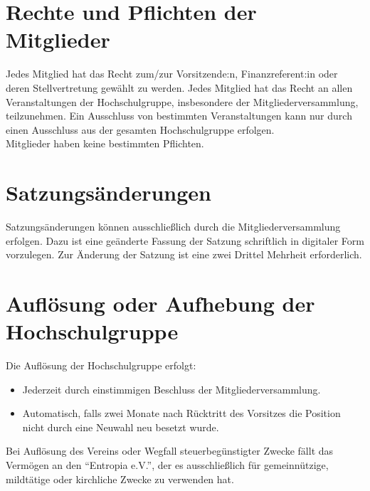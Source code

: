\documentclass[11pt]{article}
\begin{document}
\section{Rechte und Pflichten der Mitglieder}
Jedes Mitglied hat das Recht zum/zur Vorsitzende:n, Finanzreferent:in oder deren Stellvertretung gewählt zu werden. Jedes Mitglied hat das Recht an allen Veranstaltungen der Hochschulgruppe, insbesondere der Mitgliederversammlung, teilzunehmen. Ein Ausschluss von bestimmten Veranstaltungen kann nur durch einen Ausschluss aus der gesamten Hochschulgruppe erfolgen.\\
Mitglieder haben keine bestimmten Pflichten.
\section{Satzungsänderungen}
Satzungsänderungen können ausschließlich durch die Mitgliederversammlung erfolgen. Dazu ist eine geänderte Fassung der Satzung schriftlich in digitaler Form vorzulegen. Zur Änderung der Satzung ist eine zwei Drittel Mehrheit erforderlich.
\section{Auflösung oder Aufhebung der Hochschulgruppe}
Die Auflösung der Hochschulgruppe erfolgt:
\begin{itemize}
	\item Jederzeit durch einstimmigen Beschluss der Mitgliederversammlung.
	\item Automatisch, falls zwei Monate nach Rücktritt des Vorsitzes die Position nicht durch eine Neuwahl neu besetzt wurde.
\end{itemize}
Bei Auflösung des Vereins oder Wegfall steuerbegünstigter Zwecke fällt das Vermögen an den ``Entropia e.V.'', der es ausschließlich für gemeinnützige,
mildtätige oder kirchliche Zwecke zu verwenden hat.
\end{document}
